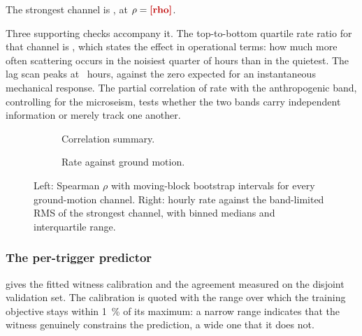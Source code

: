 The strongest channel is \ResultStrongestChannel{}, at
$\rho = \ResultStrongestRho$.

Three supporting checks accompany it. The top-to-bottom quartile rate ratio
for that channel is \ResultQuartileRatio{}, which states the effect in
operational terms: how much more often scattering occurs in the noisiest
quarter of hours than in the quietest. The lag scan peaks at
\ResultLagPeak{}~hours, against the zero expected for an instantaneous
mechanical response. The partial correlation of rate with the anthropogenic
band, controlling for the microseism, tests whether the two bands carry
independent information or merely track one another.

\begin{figure}[htbp]
\centering
\begin{subfigure}{0.49\textwidth}
  \caption{Correlation summary.}
\end{subfigure}\hfill
\begin{subfigure}{0.49\textwidth}
  \caption{Rate against ground motion.}
\end{subfigure}
\caption{Left: Spearman $\rho$ with moving-block bootstrap intervals for every
ground-motion channel. Right: hourly rate against the band-limited RMS of the
strongest channel, with binned medians and interquartile range.}
\label{fig:auxcorr}
\end{figure}

\subsubsection{The per-trigger predictor}

 gives the fitted witness calibration and the agreement
measured on the disjoint validation set. The calibration is quoted with the
range over which the training objective stays within \SI{1}{\percent} of its
maximum: a narrow range indicates that the witness genuinely constrains the
prediction, a wide one that it does not.

\begin{table}[htbp]
\centering
\caption{Scattering predictor $f_n = 2n|v|/\lambda$ against the witness
. The calibration $\alpha$ is fitted on
a training set and frozen before the validation measurement; the
\SI{1}{\percent} range is the interval over which the training objective stays
within one per cent of its maximum.}
\label{tab:witness}
\small
{}
\end{table}


